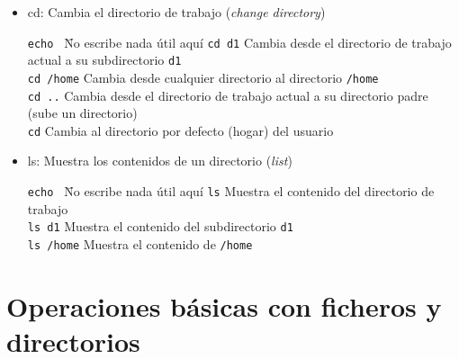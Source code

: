 \documentclass[ucs]{beamer}
\begin{document}
\begin{frame}[fragile]


  \begin{itemize}
  \item cd: Cambia el directorio de trabajo (\emph{change directory})
    \begin{footnotesize}
      \begin{tabbing}
        \verb|echo |\hspace{1cm} \= No escribe nada útil aquí\kill
        \verb|cd d1| \> Cambia desde el directorio de trabajo actual a su
        subdirectorio \verb|d1|\\
        \verb|cd /home| \> Cambia desde cualquier directorio al
        directorio \verb|/home|\\
        \verb|cd ..| \> Cambia desde el directorio de trabajo actual a su
        directorio padre\\ \> (sube un directorio)\\
        \verb|cd| \> Cambia al directorio por defecto (hogar) del usuario
      \end{tabbing}
    \end{footnotesize}
    
  \item ls: Muestra los contenidos de un directorio (\emph{list})
    \begin{footnotesize}
      \begin{tabbing}
        \verb|echo |\hspace{1cm} \= No escribe nada útil aquí\kill
        \verb|ls| \> Muestra el contenido del directorio de trabajo \\
        \verb|ls d1| \> Muestra el contenido del subdirectorio \verb|d1|\\
        \verb|ls /home| \> Muestra el contenido de \verb|/home|\\
      \end{tabbing}
    \end{footnotesize}


  \end{itemize}


\end{frame}


\section{Operaciones básicas con ficheros y directorios}
\end{document}
